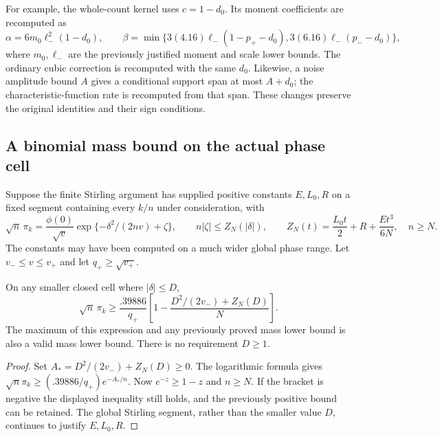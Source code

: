 For example, the whole-count kernel uses $c=1-d_0$. Its moment coefficients
are recomputed as
\[
 \alpha=6m_0\ell_-^2(1-d_0),\qquad
 \beta=\min\{3(4.16)\ell_-(1-p_+-d_0),
                  3(6.16)\ell_-(p_--d_0)\},
\]
where $m_0,\ell_-$ are the previously justified moment and scale lower
bounds. The ordinary cubic correction is recomputed with the same $d_0$.
Likewise, a noise amplitude bound $A$ gives a conditional support span at
most $A+d_0$; the characteristic-function rate is recomputed from that span.
These changes preserve the original identities and their sign conditions.

\subsection{A binomial mass bound on the actual phase cell}
Suppose the finite Stirling argument has supplied positive constants
$E,L_0,R$ on a fixed segment containing every $k/n$ under consideration, with
\[
 \sqrt n\,\pi_k=\frac{\phi(0)}{\sqrt v}
       \exp\{-\delta^2/(2nv)+\zeta\},\qquad
 n|\zeta|\le Z_N(|\delta|),\qquad
 Z_N(t)=\frac{L_0t}{2}+R+\frac{Et^3}{6N},
 \quad n\ge N.
\]
The constants may have been computed on a much wider global phase range.
Let $v_-\le v\le v_+$ and let $q_+\ge\sqrt{v_+}$.
\begin{lemma}\label{lem:mass}
On any smaller closed cell where $|\delta|\le D$,
\[
 \sqrt n\,\pi_k\ge
 \frac{.39886}{q_+}
 \left[1-\frac{D^2/(2v_-)+Z_N(D)}N\right].
\]
The maximum of this expression and any previously proved mass lower bound
is also a valid mass lower bound. There is no requirement $D\ge1$.
\end{lemma}
\begin{proof}
Set $A_*=D^2/(2v_-)+Z_N(D)\ge0$. The logarithmic formula gives
$\sqrt n\pi_k\ge(.39886/q_+)e^{-A_*/n}$.
Now $e^{-z}\ge1-z$ and $n\ge N$. If the bracket is negative the displayed
inequality still holds, and the previously positive bound can be retained.
The global Stirling segment, rather than the smaller value $D$, continues
to justify $E,L_0,R$.
\end{proof}

